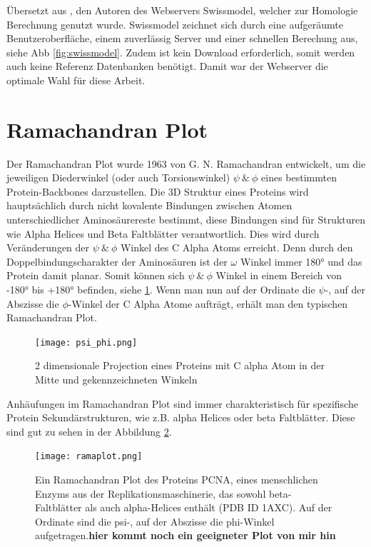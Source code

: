 Übersetzt aus \cite{Biasini.2014}, den Autoren des Webservers Swissmodel, welcher zur Homologie Berechnung genutzt wurde. Swissmodel zeichnet sich durch eine aufgeräumte Benutzeroberfläche, einem zuverlässig Server und einer schnellen Berechung aus, siehe \ac{Abb} \ref{fig:swissmodel}. Zudem ist kein Download erforderlich, somit werden auch keine Referenz Datenbanken benötigt. Damit war der Webserver die optimale Wahl für diese Arbeit.



\section{Ramachandran Plot}

Der Ramachandran Plot wurde 1963 von G. N. Ramachandran \cite{RAMACHANDRAN.1963} entwickelt, um die jeweiligen Diederwinkel (oder auch Torsionswinkel)  $\psi\ \&\ \phi$ eines bestimmten Protein-Backbones darzustellen. Die 3D Struktur eines Proteins wird hauptsächlich durch nicht kovalente Bindungen zwischen Atomen unterschiedlicher Aminosäurereste bestimmt, diese Bindungen sind für Strukturen wie Alpha Helices und Beta Faltblätter verantwortlich. Dies wird durch Veränderungen der  $\psi\ \&\ \phi$ Winkel des C Alpha Atoms erreicht. Denn durch den Doppelbindungscharakter der Aminosäuren ist der $\omega$ Winkel immer 180° und das Protein damit planar. Somit können sich $\psi\ \&\ \phi$ Winkel in einem Bereich von -180° bis +180° befinden, siehe \ref{fig:psi_phi}. Wenn man nun auf der Ordinate die $\psi$-, auf der Abszisse die $\phi$-Winkel der C Alpha Atome aufträgt, erhält man den typischen Ramachandran Plot. 

\begin{figure}
    \texttt{[image: psi\_phi.png]}
    \caption{2 dimensionale Projection eines Proteins mit C alpha Atom in der Mitte und gekennzeichneten Winkeln\protect\footnotemark}
    \label{fig:psi_phi}
\end{figure}

Anhäufungen im Ramachandran Plot sind immer charakteristisch für spezifische Protein Sekundärstrukturen, wie z.B. alpha Helices oder beta Faltblätter. Diese sind gut zu sehen in der Abbildung \ref{fig:ramaplot}.

\begin{figure}
\texttt{[image: ramaplot.png]}
\caption{Ein Ramachandran Plot des Proteins PCNA, eines menschlichen Enzyms aus der Replikationsmaschinerie, das sowohl beta-Faltblätter als auch alpha-Helices enthält (PDB ID 1AXC). Auf der Ordinate sind die psi-, auf der Abszisse die phi-Winkel aufgetragen.\protect\footnotemark \textbf{hier kommt noch ein geeigneter Plot von mir hin}}
\label{fig:ramaplot}
\end{figure}

